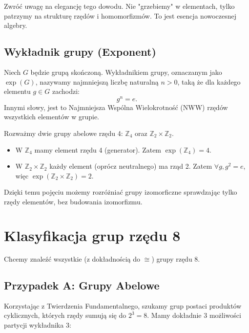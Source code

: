 \begin{remark}
Zwróć uwagę na elegancję tego dowodu. Nie "grzebiemy" w elementach, tylko patrzymy na strukturę rzędów i homomorfizmów. To jest esencja nowoczesnej algebry.
\end{remark}

\subsection{Wykładnik grupy (Exponent)}
\begin{definition}
    Niech $G$ będzie grupą skończoną. Wykładnikiem grupy, oznaczanym jako $\exp(G)$, nazywamy najmniejszą liczbę naturalną $n > 0$, taką że dla każdego elementu $g \in G$ zachodzi:
    \[ g^n = e. \]
    Innymi słowy, jest to Najmniejsza Wspólna Wielokrotność (NWW) rzędów wszystkich elementów w grupie.
\end{definition}

\begin{eg}
    Rozważmy dwie grupy abelowe rzędu 4: $\mathbb{Z}_4$ oraz $\mathbb{Z}_2 \times \mathbb{Z}_2$.
    \begin{itemize}
        \item W $\mathbb{Z}_4$ mamy element rzędu 4 (generator). Zatem $\exp(\mathbb{Z}_4) = 4$.
        \item W $\mathbb{Z}_2 \times \mathbb{Z}_2$ każdy element (oprócz neutralnego) ma rząd 2. Zatem $\forall g, g^2=e$, więc $\exp(\mathbb{Z}_2 \times \mathbb{Z}_2) = 2$.
    \end{itemize}
    Dzięki temu pojęciu możemy rozróżniać grupy izomorficzne sprawdzając tylko rzędy elementów, bez budowania izomorfizmu.
\end{eg}

\section{Klasyfikacja grup rzędu 8}

\begin{goall}
    Chcemy znaleźć wszystkie (z dokładnością do $\cong$) grupy rzędu 8.
\end{goall}

\subsection{Przypadek A: Grupy Abelowe}
Korzystając z Twierdzenia Fundamentalnego, szukamy grup postaci produktów cyklicznych, których rzędy sumują się do $2^3=8$. Mamy dokładnie 3 możliwości partycji wykładnika 3:

